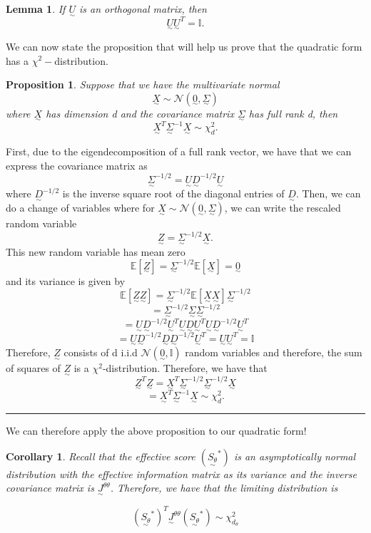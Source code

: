 \documentclass[twoside]{article}
\newtheorem{lemma}[theorem]{Lemma}
\newtheorem{proposition}[theorem]{Proposition}
\newtheorem{corollary}[theorem]{Corollary}
\newenvironment{proof}{{\bf Proof:}}{\hfill\rule{2mm}{2mm}}
\newcommand{\utilde}{\underset{\sim}}
\begin{document}
\begin{lemma}If $\utilde{U}$ is an orthogonal matrix, then 
$$
\utilde{U}\utilde{U}^T = \mathbb{I}.
$$
\end{lemma}

We can now state the proposition that will help us prove that the quadratic form has a $\chi^2-$distribution.

\begin{proposition}Suppose that we have the multivariate normal 
$$
\utilde{X} \sim \mathcal{N}(\utilde{0}, \utilde{\Sigma})
$$
where $\utilde{X}$ has dimension d and the covariance matrix $\utilde{\Sigma}$ has full rank d, then 
$$
\utilde{X}^T\utilde{\Sigma}^{-1}\utilde{X} \sim \chi_d^2.
$$
\end{proposition}

\begin{proof} First, due to the eigendecomposition of a full rank vector, we have that we can express the covariance matrix as 
$$
\utilde{\Sigma}^{-1/2} = \utilde{U}\utilde{D}^{-1/2}\utilde{U}
$$
where $\utilde{D}^{-1/2}$ is the inverse square root of the diagonal entries of $\utilde{D}.$ Then, we can do a change of variables where for $\utilde{X} \sim \mathcal{N}(\utilde{0}, \utilde{\Sigma})$, we can write the rescaled random variable 
$$
\utilde{Z} = \utilde{\Sigma}^{-1/2}\utilde{X}.
$$
This new random variable has mean zero 
$$
\mathbb{E}[\utilde{Z}] = \utilde{\Sigma}^{-1/2}\mathbb{E}[\utilde{X}] = \utilde{0}
$$
and its variance is given by 
$$
\mathbb{E}[\utilde{Z}\utilde{Z}] = \utilde{\Sigma}^{-1/2}\mathbb{E}[\utilde{X}\utilde{X}]\utilde{\Sigma}^{-1/2}
$$
$$
= \utilde{\Sigma}^{-1/2}\utilde{\Sigma}\utilde{\Sigma}^{-1/2}
$$
$$
= \utilde{U}\utilde{D}^{-1/2}\utilde{U}^T\utilde{U}\utilde{D}\utilde{U}^T\utilde{U}\utilde{D}^{-1/2}\utilde{U}^T
$$
$$
= \utilde{U}\utilde{D}^{-1/2}\utilde{D}\utilde{D}^{-1/2}\utilde{U}^T = \utilde{U}\utilde{U}^T = \mathbb{I}
$$
Therefore, $\utilde{Z}$ consists of d i.i.d $\mathcal{N}(\utilde{0}, \mathbb{I})$ random variables and therefore, the sum of squares of $\utilde{Z}$ is a $\chi^2$-distribution. Therefore, we have that
$$
\utilde{Z}^T\utilde{Z} = \utilde{X}^T\utilde{\Sigma}^{-1/2}\utilde{\Sigma}^{-1/2}\utilde{X}
$$
$$
= \utilde{X}^T\utilde{\Sigma}^{-1}\utilde{X} \sim \chi_{d}^2.
$$
\end{proof}

We can therefore apply the above proposition to our quadratic form!
\begin{corollary}Recall that the effective score $(\utilde{S_{\theta}}^{*})$ is an asymptotically normal distribution with the effective information matrix as its variance and the inverse covariance matrix is $\utilde{J}^{\theta \theta}$. Therefore, we have that the limiting distribution is

$$(\utilde{S_{\theta}}^{*})^T\utilde{J}^{\theta \theta}(\utilde{S_{\theta}}^{*}) \sim \chi_{d_{\theta}}^{2}$$
\end{corollary}
\end{document}
